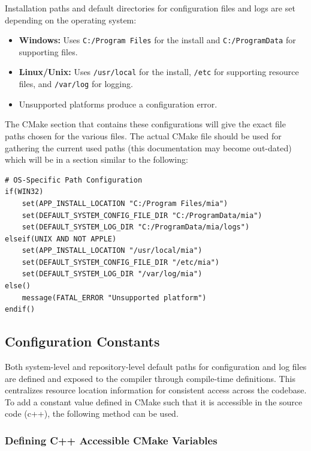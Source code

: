 Installation paths and default directories for configuration files and logs are set depending on the operating system:
\begin{itemize}\itemsep0em
	\item \textbf{Windows:} Uses \texttt{C:/Program Files} for the install and \texttt{C:/ProgramData} for supporting files.
	\item \textbf{Linux/Unix:} Uses \texttt{/usr/local} for the install, \texttt{/etc} for supporting resource files, and \texttt{/var/log} for logging.
	\item Unsupported platforms produce a configuration error.
\end{itemize}
The CMake section that contains these configurations will give the exact file paths chosen for the various files. The actual CMake file should be used for gathering the current used paths (this documentation may become out-dated) which will be in a section similar to the following:
\begin{lstlisting}[style=makestyle]
# OS-Specific Path Configuration
if(WIN32)
    set(APP_INSTALL_LOCATION "C:/Program Files/mia")
    set(DEFAULT_SYSTEM_CONFIG_FILE_DIR "C:/ProgramData/mia")
    set(DEFAULT_SYSTEM_LOG_DIR "C:/ProgramData/mia/logs")
elseif(UNIX AND NOT APPLE)
    set(APP_INSTALL_LOCATION "/usr/local/mia")
    set(DEFAULT_SYSTEM_CONFIG_FILE_DIR "/etc/mia")
    set(DEFAULT_SYSTEM_LOG_DIR "/var/log/mia")
else()
    message(FATAL_ERROR "Unsupported platform")
endif()
\end{lstlisting}

\subsection{Configuration Constants}

Both system-level and repository-level default paths for configuration and log files are defined and exposed to the compiler through compile-time definitions. This centralizes resource location information for consistent access across the codebase. To add a constant value defined in CMake such that it is accessible in the source code (c++), the following method can be used.

\subsubsection{Defining C++ Accessible CMake Variables}\label{section:cmake_setup_cpp}

